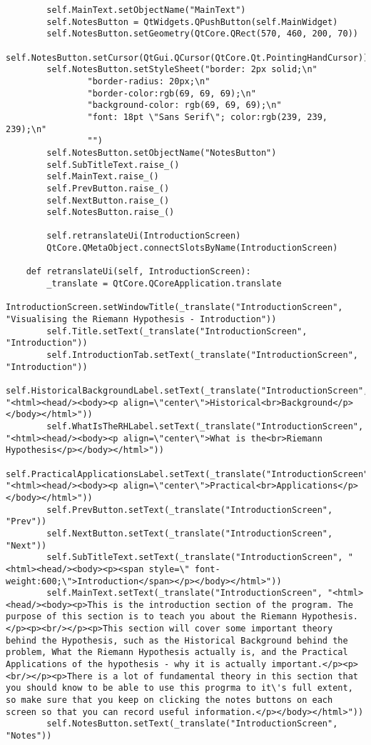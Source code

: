 \documentclass{article}
\begin{document}
\begin{lstlisting}
        self.MainText.setObjectName("MainText")
        self.NotesButton = QtWidgets.QPushButton(self.MainWidget)
        self.NotesButton.setGeometry(QtCore.QRect(570, 460, 200, 70))
        self.NotesButton.setCursor(QtGui.QCursor(QtCore.Qt.PointingHandCursor))
        self.NotesButton.setStyleSheet("border: 2px solid;\n"
                "border-radius: 20px;\n"
                "border-color:rgb(69, 69, 69);\n"
                "background-color: rgb(69, 69, 69);\n"
                "font: 18pt \"Sans Serif\"; color:rgb(239, 239, 239);\n"
                "")
        self.NotesButton.setObjectName("NotesButton")
        self.SubTitleText.raise_()
        self.MainText.raise_()
        self.PrevButton.raise_()
        self.NextButton.raise_()
        self.NotesButton.raise_()

        self.retranslateUi(IntroductionScreen)
        QtCore.QMetaObject.connectSlotsByName(IntroductionScreen)

    def retranslateUi(self, IntroductionScreen):
        _translate = QtCore.QCoreApplication.translate
        IntroductionScreen.setWindowTitle(_translate("IntroductionScreen", "Visualising the Riemann Hypothesis - Introduction"))
        self.Title.setText(_translate("IntroductionScreen", "Introduction"))
        self.IntroductionTab.setText(_translate("IntroductionScreen", "Introduction"))
        self.HistoricalBackgroundLabel.setText(_translate("IntroductionScreen", "<html><head/><body><p align=\"center\">Historical<br>Background</p></body></html>"))
        self.WhatIsTheRHLabel.setText(_translate("IntroductionScreen", "<html><head/><body><p align=\"center\">What is the<br>Riemann Hypothesis</p></body></html>"))
        self.PracticalApplicationsLabel.setText(_translate("IntroductionScreen", "<html><head/><body><p align=\"center\">Practical<br>Applications</p></body></html>"))
        self.PrevButton.setText(_translate("IntroductionScreen", "Prev"))
        self.NextButton.setText(_translate("IntroductionScreen", "Next"))
        self.SubTitleText.setText(_translate("IntroductionScreen", "<html><head/><body><p><span style=\" font-weight:600;\">Introduction</span></p></body></html>"))
        self.MainText.setText(_translate("IntroductionScreen", "<html><head/><body><p>This is the introduction section of the program. The purpose of this section is to teach you about the Riemann Hypothesis.</p><p><br/></p><p>This section will cover some important theory behind the Hypothesis, such as the Historical Background behind the problem, What the Riemann Hypothesis actually is, and the Practical Applications of the hypothesis - why it is actually important.</p><p><br/></p><p>There is a lot of fundamental theory in this section that you should know to be able to use this progrma to it\'s full extent, so make sure that you keep on clicking the notes buttons on each screen so that you can record useful information.</p></body></html>"))
        self.NotesButton.setText(_translate("IntroductionScreen", "Notes"))
\end{lstlisting}
\end{document}
